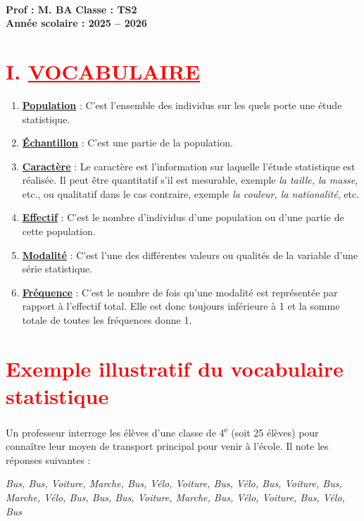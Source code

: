 \documentclass[12pt,a4paper]{article}
\newcounter{exemple}
\begin{document}
\begin{center}
    \Large{}\\[-0.1cm]
    \normalsize\textbf{Prof : M. BA} \hfill \textbf{Classe : TS2}\\[-0.1cm]
    \textbf{Année scolaire : 2025 -- 2026}
\end{center}

\section*{\textcolor{red}{I. \underline{VOCABULAIRE}}}

\begin{enumerate}
    \item \textbf{\underline{Population}} : C’est l’ensemble des individus sur les quels porte une étude statistique.
    \item \textbf{\underline{Échantillon}} : C’est une partie de la population.
    \item \textbf{\underline{Caractère}} : Le caractère est l’information sur laquelle l’étude statistique est réalisée. Il peut être quantitatif s’il est mesurable, exemple \textit{la taille, la masse}, etc., ou qualitatif dans le cas contraire, exemple \textit{la couleur, la nationalité}, etc.
    \item \textbf{\underline{Effectif}} : C’est le nombre d’individus d’une population ou d’une partie de cette population.
    \item \textbf{\underline{Modalité}} : C’est l’une des différentes valeurs ou qualités de la variable d’une série statistique.
    \item \textbf{\underline{Fréquence}} : C’est le nombre de fois qu’une modalité est représentée par rapport à l’effectif total. Elle est donc toujours inférieure à 1 et la somme totale de toutes les fréquences donne 1.
\end{enumerate}

\section*{\textcolor{red}{Exemple illustratif du vocabulaire statistique}}

\begin{tcolorbox}[colback=gray!5, colframe=black, title=\textbf{Situation}]
Un professeur interroge les élèves d’une classe de 4\textsuperscript{e} (soit 25 élèves) pour connaître leur moyen de transport principal pour venir à l’école. Il note les réponses suivantes :
\begin{center}
\textit{Bus, Bus, Voiture, Marche, Bus, Vélo, Voiture, Bus, Vélo, Bus, Voiture, Bus, Marche, Vélo, Bus, Bus, Bus, Voiture, Marche, Bus, Vélo, Voiture, Bus, Vélo, Bus}
\end{center}
\end{tcolorbox}
\end{document}
